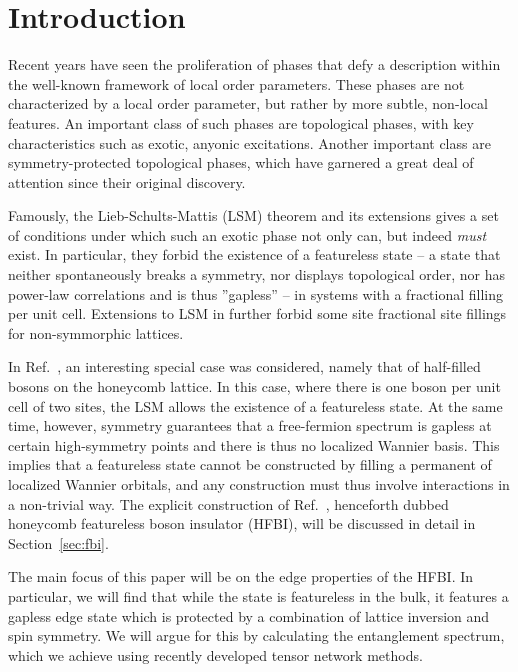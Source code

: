 
\section{Introduction}


Recent years have seen the proliferation of phases that defy a description
within the well-known framework of local order parameters. These phases are
not characterized by a local order parameter, but rather by more subtle,
non-local features. An important class of such phases are topological phases,
with key characteristics such as exotic, anyonic excitations. Another
important class are symmetry-protected topological phases, which have
garnered a great deal of attention since their original discovery.

Famously, the Lieb-Schults-Mattis (LSM) theorem and its extensions gives a set of
conditions under which such an exotic phase not only can, but indeed \emph{must}
exist. In particular, they forbid the existence of a featureless state
-- a state that neither spontaneously breaks a symmetry, nor displays topological
order, nor has power-law correlations and is thus ''gapless'' -- in systems
with a fractional filling per unit cell. Extensions to LSM in  further
forbid some site fractional site fillings for non-symmorphic lattices.

In Ref.~, an interesting special case was considered,
namely that of half-filled bosons on the honeycomb lattice. In this case, where
there is one boson per unit cell of two sites, the LSM allows the existence
of a featureless state. At the same time, however, symmetry guarantees that
a free-fermion spectrum is gapless at certain high-symmetry points and there is
thus no localized Wannier basis. This implies that
a featureless state cannot be constructed by filling a permanent
of localized Wannier orbitals, and any construction must thus involve interactions
in a non-trivial way. The explicit construction of Ref.~,
henceforth dubbed honeycomb featureless boson insulator (HFBI),
will be discussed in detail in Section~\ref{sec:fbi}.

The main focus of this paper will be on the edge properties of the HFBI.
In particular, we will find that while the state is featureless in the bulk, it
features a gapless edge state which is protected by a combination of lattice inversion
and spin symmetry. We will argue for this by calculating the entanglement spectrum,
which we achieve using recently developed tensor network methods.


